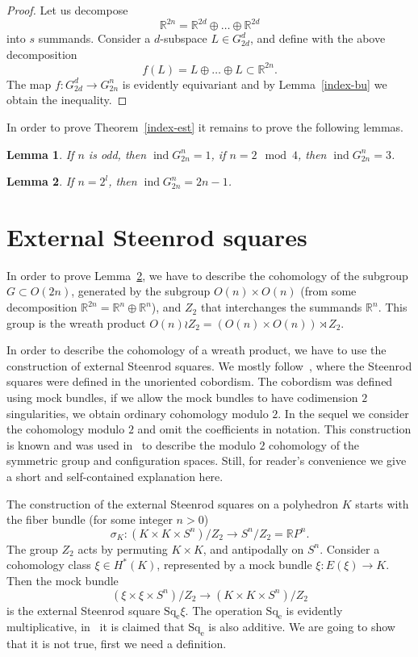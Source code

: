 \documentclass[12pt,a4paper]{amsart}
\newtheorem{lem}{Lemma}
\theoremstyle{definition}
\theoremstyle{remark}
\begin{document}
\begin{proof}
Let us decompose 
$$
\mathbb R^{2n} = \mathbb R^{2d}\oplus\dots\oplus \mathbb R^{2d}
$$
into $s$ summands. Consider a $d$-subspace $L\in G_{2d}^d$, and define with the above decomposition
$$
f(L) = L\oplus\dots\oplus L\subset \mathbb R^{2n}.
$$
The map $f:G_{2d}^d\to G_{2n}^n$ is evidently equivariant and by Lemma~\ref{index-bu} we obtain the inequality.
\end{proof}

In order to prove Theorem~\ref{index-est} it remains to prove the following lemmas.

\begin{lem}
\label{index-odd}
If $n$ is odd, then $\operatorname{ind} G_{2n}^n=1$, if $n=2\mod 4$, then $\operatorname{ind} G_{2n}^n=3$.
\end{lem}

\begin{lem}
\label{index-2l}
If $n=2^l$, then $\operatorname{ind} G_{2n}^n = 2n-1$.
\end{lem}

\section{External Steenrod squares}
\label{ext-sq-sec}

In order to prove Lemma~\ref{index-2l}, we have to describe the cohomology of the subgroup $G\subset O(2n)$, generated by the subgroup $O(n)\times O(n)$ (from some decomposition $\mathbb R^{2n}=\mathbb R^n\oplus \mathbb R^n$), and $Z_2$ that interchanges the summands $\mathbb R^n$. This group is the wreath product $O(n)\wr Z_2 = (O(n)\times O(n))\rtimes Z_2$.

In order to describe the cohomology of a wreath product, we have to use the construction of external Steenrod squares. We mostly follow~\cite[Ch.~V]{brs1976}, where the Steenrod squares were defined in the unoriented cobordism. The cobordism was defined using mock bundles, if we allow the mock bundles to have codimension $2$ singularities, we obtain ordinary cohomology modulo $2$. In the sequel we consider the cohomology modulo $2$ and omit the coefficients in notation. This construction is known and was used in~\cite{hung1990} to describe the modulo $2$ cohomology of the symmetric group and configuration spaces. Still, for reader's convenience we give a short and self-contained explanation here.

The construction of the external Steenrod squares on a polyhedron $K$ starts with the fiber bundle (for some integer $n>0$)
$$
\sigma_K: (K\times K\times S^n)/Z_2\to S^n/Z_2=\mathbb RP^n.
$$
The group $Z_2$ acts by permuting $K\times K$, and antipodally on $S^n$.
Consider a cohomology class $\xi\in H^*(K)$, represented by a mock bundle $\xi : E(\xi)\to K$. Then the mock bundle 
$$
(\xi\times \xi\times S^n)/Z_2\to (K\times K\times S^n)/Z_2
$$
is the external Steenrod square $\operatorname{Sq_e} \xi$. The operation $\operatorname{Sq_e}$ is evidently multiplicative, in~\cite[Ch.~V, Proposition~3.3]{brs1976} it is claimed that $\operatorname{Sq_e}$ is also additive. We are going to show that it is not true, first we need a definition.
\end{document}
